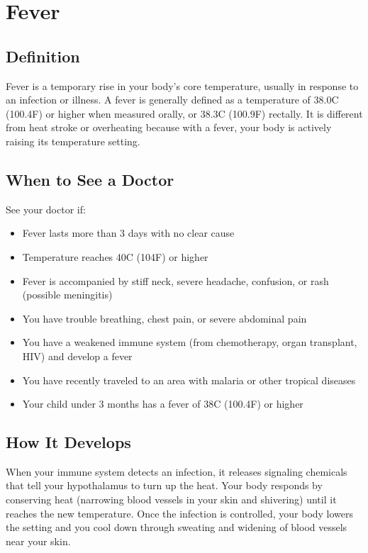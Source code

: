 \chapter{Fever}

\section*{Definition}
Fever is a temporary rise in your body's core temperature, usually in response to an infection or illness. A fever is generally defined as a temperature of 38.0\textdegree{}C (100.4\textdegree{}F) or higher when measured orally, or 38.3\textdegree{}C (100.9\textdegree{}F) rectally. It is different from heat stroke or overheating because with a fever, your body is actively raising its temperature setting.

\section*{When to See a Doctor}
See your doctor if:
\begin{itemize}
  \item Fever lasts more than 3 days with no clear cause
  \item Temperature reaches 40\textdegree{}C (104\textdegree{}F) or higher
  \item Fever is accompanied by stiff neck, severe headache, confusion, or rash (possible meningitis)
  \item You have trouble breathing, chest pain, or severe abdominal pain
  \item You have a weakened immune system (from chemotherapy, organ transplant, HIV) and develop a fever
  \item You have recently traveled to an area with malaria or other tropical diseases
  \item Your child under 3 months has a fever of 38\textdegree{}C (100.4\textdegree{}F) or higher
\end{itemize}

\section*{How It Develops}
When your immune system detects an infection, it releases signaling chemicals that tell your hypothalamus to turn up the heat. Your body responds by conserving heat (narrowing blood vessels in your skin and shivering) until it reaches the new temperature. Once the infection is controlled, your body lowers the setting and you cool down through sweating and widening of blood vessels near your skin.

